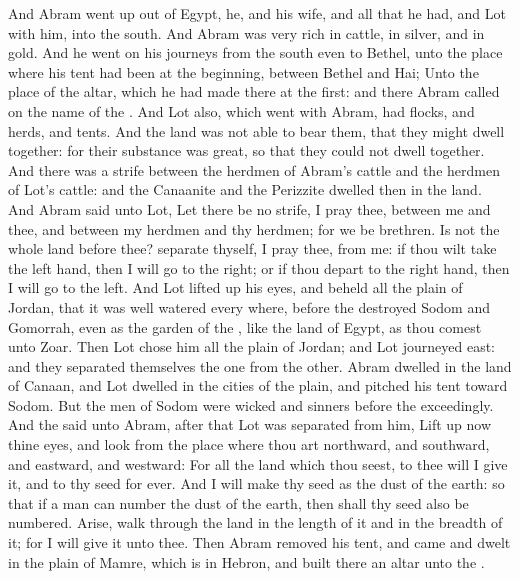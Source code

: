 \begin{biblechapter} %
 And Abram went up out of Egypt, he, and his wife, and all that he had, and Lot with him, into the south.
\verse And Abram was very rich in cattle, in silver, and in gold.
\verse And he went on his journeys from the south even to Bethel, unto the place where his tent had been at the beginning, between Bethel and Hai;
\verse Unto the place of the altar, which he had made there at the first: and there Abram called on the name of the \LORD.
\verse And Lot also, which went with Abram, had flocks, and herds, and tents.
\verse And the land was not able to bear them, that they might dwell together: for their substance was great, so that they could not dwell together.
\verse And there was a strife between the herdmen of Abram's cattle and the herdmen of Lot's cattle: and the Canaanite and the Perizzite dwelled then in the land.
\verse And Abram said unto Lot, Let there be no strife, I pray thee, between me and thee, and between my herdmen and thy herdmen; for we be brethren.
\verse Is not the whole land before thee? separate thyself, I pray thee, from me: if thou wilt take the left hand, then I will go to the right; or if thou depart to the right hand, then I will go to the left.
\verse And Lot lifted up his eyes, and beheld all the plain of Jordan, that it was well watered every where, before the \LORD destroyed Sodom and Gomorrah, even as the garden of the \LORD, like the land of Egypt, as thou comest unto Zoar.
\verse Then Lot chose him all the plain of Jordan; and Lot journeyed east: and they separated themselves the one from the other.
\verse Abram dwelled in the land of Canaan, and Lot dwelled in the cities of the plain, and pitched his tent toward Sodom.
\verse But the men of Sodom were wicked and sinners before the \LORD exceedingly.
\verse And the \LORD said unto Abram, after that Lot was separated from him, Lift up now thine eyes, and look from the place where thou art northward, and southward, and eastward, and westward:
\verse For all the land which thou seest, to thee will I give it, and to thy seed for ever.
\verse And I will make thy seed as the dust of the earth: so that if a man can number the dust of the earth, then shall thy seed also be numbered.
\verse Arise, walk through the land in the length of it and in the breadth of it; for I will give it unto thee.
\verse Then Abram removed his tent, and came and dwelt in the plain of Mamre, which is in Hebron, and built there an altar unto the \LORD.
\end{biblechapter}

